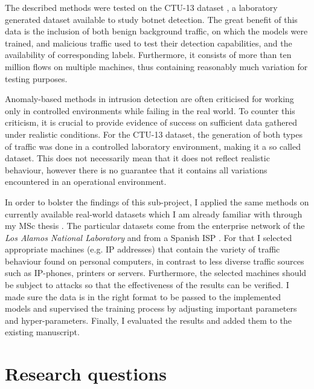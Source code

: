 \documentclass[a4paper,12pt,twoside]{report}
\begin{document}

The described methods were tested on the CTU-13 dataset \cite{garcia2014empirical}, a laboratory generated dataset available to study botnet detection. The great benefit of this data is the inclusion of both benign background traffic, on which the models were trained, and malicious traffic used to test their detection capabilities, and the availability of corresponding labels. Furthermore, it consists of more than ten million flows on multiple machines, thus containing reasonably much variation for testing purposes.

Anomaly-based methods in intrusion detection are often criticised for working only in controlled environments while failing in the real world. To counter this criticism, it is crucial to provide evidence of success on sufficient data gathered under realistic conditions. For the CTU-13 dataset, the generation of both types of traffic was done in a controlled laboratory environment, making it a so called  dataset. This does not necessarily mean that it does not reflect realistic behaviour, however there is no guarantee that it contains all variations encountered in an operational environment. 

In order to bolster the findings of this sub-project, I applied the same methods on currently available real-world datasets which I am already familiar with through my MSc thesis \cite{clausen2018bayesian}. The particular datasets come from the enterprise network of the \textit{Los Alamos National Laboratory} \cite{kent-2015-cyberdata1} and from a Spanish ISP \cite{macia2018ugr}. For that I selected appropriate machines (e.g. IP addresses) that contain the variety of traffic behaviour found on personal computers, in contrast to less diverse traffic sources such as IP-phones, printers or servers. Furthermore, the selected machines should be subject to attacks so that the effectiveness of the results can be verified. I made sure the data is in the right format to be passed to the implemented models and supervised the training process by adjusting important parameters and hyper-parameters. Finally, I evaluated the results and added them to the existing manuscript.

\section{Research questions}\label{RQ}
\end{document}
